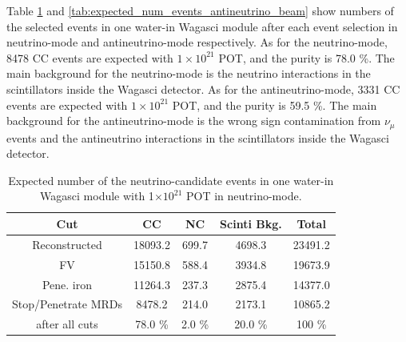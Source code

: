 

Table \ref{tab:expected_num_events_neutrino_beam} and \ref{tab:expected_num_events_antineutrino_beam}  show numbers of the selected events in one water-in Wagasci module after each event selection in neutrino-mode and antineutrino-mode respectively.
As for the neutrino-mode, 8478 CC events are expected with $1 \times 10^{21}$  POT, and the purity is 78.0 \%.
The main background for the neutrino-mode is the neutrino interactions in the scintillators inside the Wagasci detector.
As for the antineutrino-mode, 3331 CC events are expected with $1 \times 10^{21}$  POT, and the purity is 59.5 \%.
The main background for the antineutrino-mode is the wrong sign contamination from $\nu_{\mu}$ events and the antineutrino interactions in the scintillators inside the Wagasci detector.

\begin{table}[htb]
  \begin{center}
    \caption{Expected number of the neutrino-candidate events in one water-in Wagasci module with 1$\times 10^{21}$ POT in neutrino-mode.}
    \begin{tabular}{c|ccc|c} \hline
Cut   & CC & NC & Scinti Bkg. & Total \\ \hline
Reconstructed & 18093.2 & 699.7 & 4698.3 & 23491.2 \\
FV & 15150.8 & 588.4 & 3934.8 & 19673.9 \\
Pene. iron & 11264.3 & 237.3 & 2875.4 & 14377.0 \\
Stop/Penetrate MRDs & 8478.2 & 214.0 & 2173.1 & 10865.2 \\ \hline
after all cuts & 78.0 \% & 2.0 \% & 20.0 \% & 100 \% \\
\hline
    \end{tabular}
    \label{tab:expected_num_events_neutrino_beam}
  \end{center}
\end{table}

